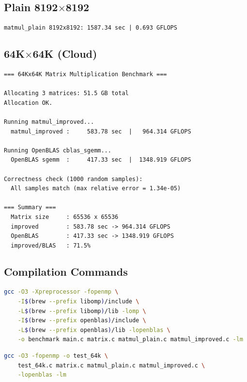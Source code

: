 \subsection{Plain 8192$\times$8192}

\begin{lstlisting}[language={},caption={Plain baseline at 8K}]
matmul_plain 8192x8192: 1587.34 sec | 0.693 GFLOPS
\end{lstlisting}

\subsection{64K$\times$64K (Cloud)}

\begin{lstlisting}[language={},caption={64K benchmark (Alibaba Cloud g8y.8xlarge, 32-core ARM)}]
=== 64Kx64K Matrix Multiplication Benchmark ===

Allocating 3 matrices: 51.5 GB total
Allocation OK.

Running matmul_improved...
  matmul_improved :     583.78 sec  |   964.314 GFLOPS

Running OpenBLAS cblas_sgemm...
  OpenBLAS sgemm  :     417.33 sec  |  1348.919 GFLOPS

Correctness check (1000 random samples):
  All samples match (max relative error = 1.34e-05)

=== Summary ===
  Matrix size     : 65536 x 65536
  improved        : 583.78 sec -> 964.314 GFLOPS
  OpenBLAS        : 417.33 sec -> 1348.919 GFLOPS
  improved/BLAS   : 71.5%
\end{lstlisting}

\subsection{Compilation Commands}

\begin{lstlisting}[language=bash,caption={Local (macOS)}]
gcc -O3 -Xpreprocessor -fopenmp \
    -I$(brew --prefix libomp)/include \
    -L$(brew --prefix libomp)/lib -lomp \
    -I$(brew --prefix openblas)/include \
    -L$(brew --prefix openblas)/lib -lopenblas \
    -o benchmark main.c matrix.c matmul_plain.c matmul_improved.c -lm
\end{lstlisting}

\begin{lstlisting}[language=bash,caption={Cloud (Linux ARM)}]
gcc -O3 -fopenmp -o test_64k \
    test_64k.c matrix.c matmul_plain.c matmul_improved.c \
    -lopenblas -lm
\end{lstlisting}
